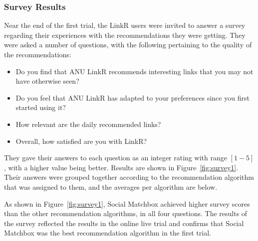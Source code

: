 \subsubsection{Survey Results}

Near the end of the first trial, the LinkR users were invited to
answer a survey regarding their experiences with the recommendations
they were getting. They were asked a number of questions, with the
following pertaining to the quality of the recommendations:

\begin{itemize}
\item{Do you find that ANU LinkR recommends interesting links that you may not have otherwise seen?}
\item{Do you feel that ANU LinkR has adapted to your preferences since you first started using it?}
\item{How relevant are the daily recommended links?}
\item{Overall, how satisfied are you with LinkR?}
\end{itemize}

They gave their answers to each question as an integer rating with
range $[1-5]$, with a higher value being better. Results are shown in
Figure~\ref{fig:survey1}. Their answers were grouped together
according to the recommendation algorithm that was assigned to them,
and the averages per algorithm are below.

As shown in Figure~\ref{fig:survey1}, Social Matchbox achieved higher
survey scores than the other recommendation algorithms, in all four
questions. The results of the survey reflected the results in the
online live trial and confirms that Social Matchbox was the best
recommendation algorithm in the first trial.
 
